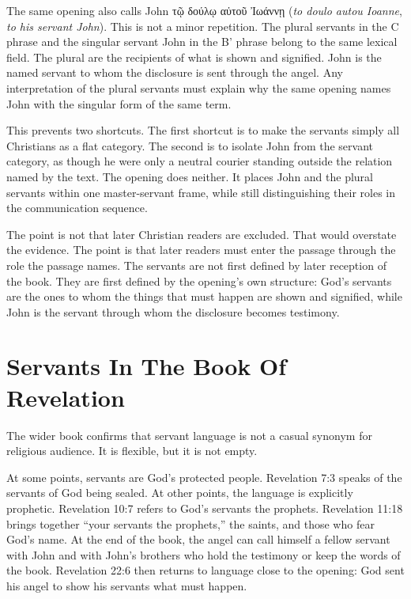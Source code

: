 The same opening also calls John \textgreek{τῷ δούλῳ αὐτοῦ Ἰωάννῃ} (\textit{to doulo autou Ioanne}, \textit{to his servant John}). This is not a minor repetition. The plural servants in the C phrase and the singular servant John in the B' phrase belong to the same lexical field. The plural are the recipients of what is shown and signified. John is the named servant to whom the disclosure is sent through the angel. Any interpretation of the plural servants must explain why the same opening names John with the singular form of the same term.

This prevents two shortcuts. The first shortcut is to make the servants simply all Christians as a flat category. The second is to isolate John from the servant category, as though he were only a neutral courier standing outside the relation named by the text. The opening does neither. It places John and the plural servants within one master-servant frame, while still distinguishing their roles in the communication sequence.

The point is not that later Christian readers are excluded. That would overstate the evidence. The point is that later readers must enter the passage through the role the passage names. The servants are not first defined by later reception of the book. They are first defined by the opening's own structure: God's servants are the ones to whom the things that must happen are shown and signified, while John is the servant through whom the disclosure becomes testimony.

\section{Servants In The Book Of Revelation}

The wider book confirms that servant language is not a casual synonym for religious audience. It is flexible, but it is not empty.

At some points, servants are God's protected people. Revelation 7:3 speaks of the servants of God being sealed. At other points, the language is explicitly prophetic. Revelation 10:7 refers to God's servants the prophets. Revelation 11:18 brings together ``your servants the prophets,'' the saints, and those who fear God's name. At the end of the book, the angel can call himself a fellow servant with John and with John's brothers who hold the testimony or keep the words of the book. Revelation 22:6 then returns to language close to the opening: God sent his angel to show his servants what must happen.


